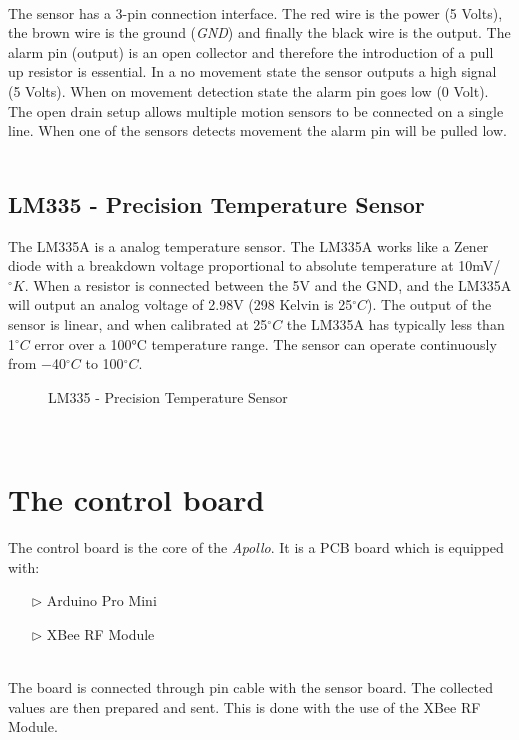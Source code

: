 \documentclass[12pt,a4paper]{report}
\begin{document}
\ \\
The sensor has a 3-pin connection interface. The red wire is the power (5 Volts), the brown wire is the ground (\textit{GND}) and finally the black wire is the output. The alarm pin (output) is an open collector and therefore the introduction of a pull up resistor is essential. In a  no movement state the sensor outputs a high signal (5 Volts). When on movement detection state the alarm pin goes low (0 Volt). The open drain setup allows multiple motion sensors to be connected on a single line. When one of the sensors detects movement the alarm pin will be pulled low.
\ \\
%
\subsection{LM335 - Precision Temperature Sensor}
%
The LM335A is a analog temperature sensor. The LM335A works like a Zener diode with a breakdown voltage proportional to absolute temperature at 10mV/$^\circ K$. When a resistor is connected between the 5V and the GND, and the LM335A will output an analog voltage of 2.98V (298 Kelvin is 25$^\circ C$).  The output of the sensor is linear, and when calibrated at 25$^\circ C$ the LM335A has typically less than 1$^\circ C$ error over a 100°C temperature range. The sensor can operate continuously from −40$^\circ C$ to 100$^\circ C$. 
\ \\
\begin{figure}[H]
\centering
\caption{LM335 - Precision Temperature Sensor}
\end{figure}
\ \\
%
\section{The control board}
The control board is the core of the \emph{Apollo}. It is a PCB board which is equipped with:
\begin{itemize}
\item[$\triangleright$]Arduino Pro Mini
\item[$\triangleright$]XBee RF Module
\end{itemize}
% 
\ \\
The board is connected through pin cable with the sensor board. The collected values are then prepared and sent. This is done with the use of the XBee RF Module.\\
%
\end{document}
